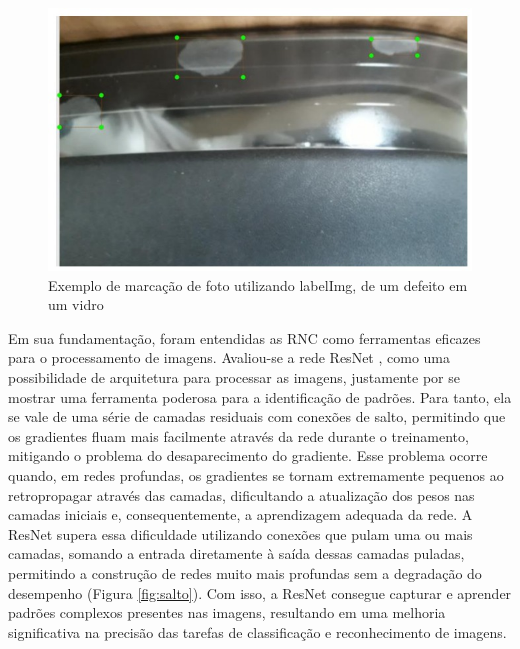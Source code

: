 \begin{figure}[!h]
    \center
    \begin{minipage}{1\linewidth}
        \center
        \captionsetup{justification=centering,margin=0.5cm,font=small}
        \includegraphics[width=0.7\linewidth]{img/cap3/mancha-marcacao.jpeg}
        \caption{Exemplo de marcação de foto utilizando labelImg, de um defeito em um vidro \cite{gonzaga2023identificaccao}}
        \label{fig:mancha}
    \end{minipage}
\end{figure}

Em sua fundamentação, foram entendidas as RNC como ferramentas eficazes para o processamento de imagens. Avaliou-se a rede ResNet \cite{he2016deep}, como uma possibilidade de arquitetura para processar as imagens, justamente por se mostrar uma ferramenta poderosa para a identificação de padrões. Para tanto, ela se vale de uma série de camadas residuais com conexões de salto, permitindo que os gradientes fluam mais facilmente através da rede durante o treinamento, mitigando o problema do desaparecimento do gradiente. Esse problema ocorre quando, em redes profundas, os gradientes se tornam extremamente pequenos ao retropropagar através das camadas, dificultando a atualização dos pesos nas camadas iniciais e, consequentemente, a aprendizagem adequada da rede. A ResNet supera essa dificuldade utilizando conexões que pulam uma ou mais camadas, somando a entrada diretamente à saída dessas camadas puladas, permitindo a construção de redes muito mais profundas sem a degradação do desempenho (Figura \ref{fig:salto}). Com isso, a ResNet consegue capturar e aprender padrões complexos presentes nas imagens, resultando em uma melhoria significativa na precisão das tarefas de classificação e reconhecimento de imagens.
	
